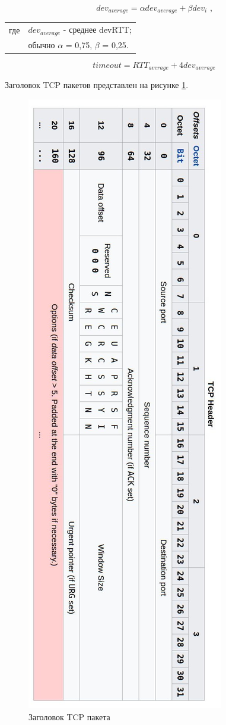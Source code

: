 \documentclass[14pt, a4paper]{extarticle}
\begin{document}
\begin{equation}
	dev_{average} =\alpha dev_{average} + \beta{dev_{i}} \text{ ,} 
\end{equation}
\begin{tabular}{rl}
	где & $dev_{average}$ - среднее devRTT; \\
	& обычно $\alpha$ = 0,75, $\beta$ = 0,25.
\end{tabular}

\begin{equation}
	timeout =  RTT_{average} + 4 dev_{average}
\end{equation}

Заголовок TCP пакетов представлен на рисунке \ref{tcp-header}.
\begin{figure}[H]
	\centering
	\includegraphics[scale=0.6]{tcpheader.jpg}
	\caption{Заголовок TCP пакета}
	\label{tcp-header}
\end{figure}
\end{document}

